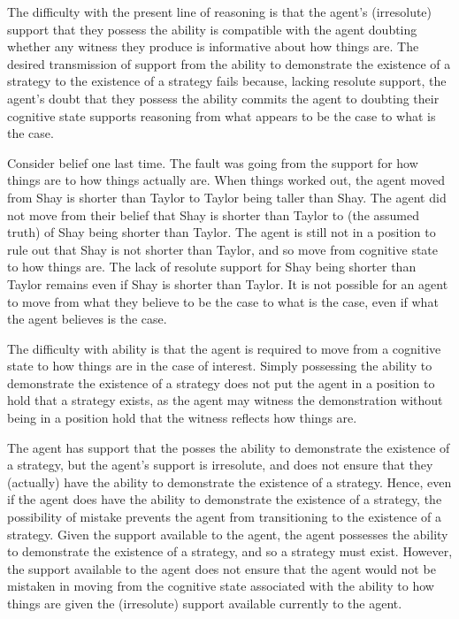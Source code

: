 \documentclass[10pt]{article}
\begin{document}
\begin{note}
  The difficulty with the present line of reasoning is that the agent's (irresolute) support that they possess the ability is compatible with the agent doubting whether any witness they produce is informative about how things are.
  The desired transmission of support from the ability to demonstrate the existence of a strategy to the existence of a strategy fails because, lacking resolute support, the agent's doubt that they possess the ability commits the agent to doubting their cognitive state supports reasoning from what appears to be the case to what is the case.
\end{note}

\begin{note}
  Consider belief one last time.
  The fault was going from the support for how things are to how things actually are.
  When things worked out, the agent moved from Shay is shorter than Taylor to Taylor being taller than Shay.
  The agent did not move from their belief that Shay is shorter than Taylor to (the assumed truth) of Shay being shorter than Taylor.
  The agent is still not in a position to rule out that Shay is not shorter than Taylor, and so move from cognitive state to how things are.
  The lack of resolute support for Shay being shorter than Taylor remains even if Shay is shorter than Taylor.
  It is not possible for an agent to move from what they believe to be the case to what is the case, even if what the agent believes is the case.

  The difficulty with ability is that the agent is required to move from a cognitive state to how things are in the case of interest.
  Simply possessing the ability to demonstrate the existence of a strategy does not put the agent in a position to hold that a strategy exists, as the agent may witness the demonstration without being in a position hold that the witness reflects how things are.

  The agent has support that the posses the ability to demonstrate the existence of a strategy, but the agent's support is irresolute, and does not ensure that they (actually) have the ability to demonstrate the existence of a strategy.
  Hence, even if the agent does have the ability to demonstrate the existence of a strategy, the possibility of mistake prevents the agent from transitioning to the existence of a strategy.
  Given the support available to the agent, the agent possesses the ability to demonstrate the existence of a strategy, and so a strategy must exist.
  However, the support available to the agent does not ensure that the agent would not be mistaken in moving from the cognitive state associated with the ability to how things are given the (irresolute) support available currently to the agent.


\end{note}
\end{document}
